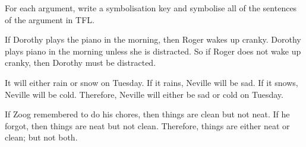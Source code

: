 \problempart
For each argument, write a symbolisation key and symbolise all of the sentences of the argument in TFL.
\begin{earg}
\item If Dorothy plays the piano in the morning, then Roger wakes up cranky. Dorothy plays piano in the morning unless she is distracted. So if Roger does not wake up cranky, then Dorothy must be distracted.
\item[] 
\item It will either rain or snow on Tuesday. If it rains, Neville will be sad. If it snows, Neville will be cold. Therefore, Neville will either be sad or cold on Tuesday.
\item[] 
\item If Zoog remembered to do his chores, then things are clean but not neat. If he forgot, then things are neat but not clean. Therefore, things are either neat or clean; but not both.
\item[] 
\end{earg}

